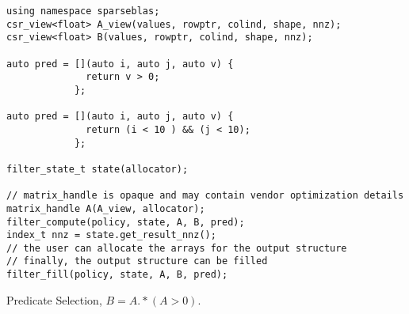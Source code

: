 \documentclass{article}
\begin{document}
\begin{listing}[H]
\begin{verbatim}
using namespace sparseblas;
csr_view<float> A_view(values, rowptr, colind, shape, nnz);
csr_view<float> B(values, rowptr, colind, shape, nnz);

auto pred = [](auto i, auto j, auto v) {
              return v > 0;
            };

auto pred = [](auto i, auto j, auto v) {
              return (i < 10 ) && (j < 10);
            };

filter_state_t state(allocator);
           
// matrix_handle is opaque and may contain vendor optimization details
matrix_handle A(A_view, allocator);
filter_compute(policy, state, A, B, pred);
index_t nnz = state.get_result_nnz();
// the user can allocate the arrays for the output structure
// finally, the output structure can be filled
filter_fill(policy, state, A, B, pred); 
\end{verbatim}
\caption{Predicate Selection, $B = A.*(A>0)$.}
\end{listing}






\newpage

\newpage




\begin{comment}
###########

// inspect (optional)
-> does nothing

//compute / compute__nnz
-> internally computes an upper bound to nnz, allocates internal memory, computes the SpGeMM

get_nnz
// user allocates CSR


//fill / extract / execute
-> copies over result from internal structure into user allocated CSR structure & deletes internal memory


###########

// inspect (optional)
-> does nothing

//compute / compute__nnz
-> only computes nnz

get_nnz
// user allocates CSR

//fill / extract / execute
-> computes the SpGeMM in the user allocated memory


if we split is up into symbolic/numeric part, we need two of each:
compute_symbolic
compute_numeric
fill_symbolic
fill_numeric


// state clearly that numeric zeros are stored
\end{comment}
\end{document}

